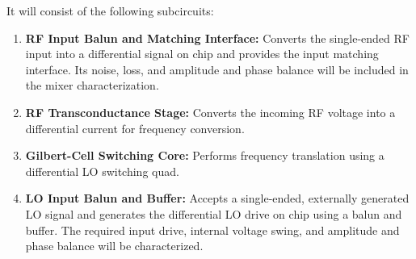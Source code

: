 \documentclass[11pt,letterpaper]{article}
\begin{document}
It will consist of the following subcircuits:

\begin{enumerate}
    \item \textbf{RF Input Balun and Matching Interface:}
    Converts the single-ended RF input into a differential signal on chip and provides the input matching interface.
    Its noise, loss, and amplitude and phase balance will be included in the mixer characterization.

    \item \textbf{RF Transconductance Stage:}
    Converts the incoming RF voltage into a differential current for frequency conversion.

    \item \textbf{Gilbert-Cell Switching Core:}
    Performs frequency translation using a differential LO switching quad.

    \item \textbf{LO Input Balun and Buffer:}
    Accepts a single-ended, externally generated LO signal and generates the differential LO drive on chip using a balun and buffer.
    The required input drive, internal voltage swing, and amplitude and phase balance will be characterized.



\end{enumerate}
\end{document}
